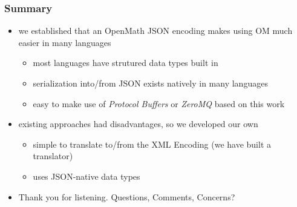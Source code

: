 \documentclass[usenames,dvipsnames]{beamer}
\begin{document}
\begin{frame}
    \frametitle{Summary}
    \begin{itemize}
        \item we established that an OpenMath JSON encoding makes using OM much easier in many languages
        \begin{itemize}
            \item most languages have strutured data types built in
            \item serialization into/from JSON exists natively in many languages
            \item easy to make use of \textit{Protocol Buffers} or \textit{ZeroMQ} based on this work
        \end{itemize}
        \item existing approaches had disadvantages, so we developed our own
        \begin{itemize}
            \item simple to translate to/from the XML Encoding (we have built a translator)
            \item uses JSON-native data types
        \end{itemize}
        \item Thank you for listening. Questions, Comments, Concerns?
    \end{itemize}
\end{frame}
\end{document}
